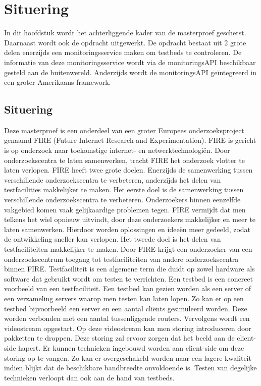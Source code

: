 \chapter{Situering}
{\samenvatting
In dit hoofdstuk wordt het achterliggende kader van de masterproef geschetst. Daarnaast wordt ook de opdracht uitgewerkt. De opdracht bestaat uit 2 grote delen enerzijds een monitoringsservice maken om testbeds te controleren. De informatie van deze monitoringsservice wordt via de monitoringsAPI beschikbaar gesteld aan de buitenwereld. Anderzijds wordt de monitoringsAPI geïntegreerd in een groter Amerikaans framework.}
\section{Situering}
\npar
Deze masterproef is een onderdeel van een groter Europees onderzoeksproject genaamd FIRE (Future Internet Research and Experimentation). FIRE is gericht is op onderzoek naar toekomstige internet- en netwerktechnologiën. Door onderzoekscentra te laten samenwerken\citep{Fire-what-is}, tracht FIRE het onderzoek vlotter te laten verlopen. FIRE heeft twee grote doelen. Enerzijds de samenwerking tussen verschillende onderzoekscentra te verbeteren, anderzijds het delen van testfacilities makkelijker te maken.
\npar
Het eerste doel is de samenwerking tussen verschillende onderzoekscentra te verbeteren. Onderzoekers binnen eenzelfde vakgebied komen vaak gelijkaardige problemen tegen. FIRE vermijdt dat men telkens het wiel opnieuw uitvindt, door deze onderzoekers makkelijker en meer te laten samenwerken. Hierdoor worden oplossingen en ideeën meer gedeeld, zodat de ontwikkeling sneller kan verlopen.
\clearpage
\npar
Het tweede doel is het delen van testfaciliteiten makkelijker te maken. Door FIRE krijgt een onderzoeker van een onderzoekscentrum toegang tot testfaciliteiten van andere onderzoekscentra binnen FIRE. Testfaciliteit is een algemene term die duidt op zowel hardware als software dat gebruikt wordt om testen te verrichten. Een testbed is een concreet voorbeeld van een testfaciliteit. Een testbed kan gezien worden als een server of een verzameling servers waarop men testen kan laten lopen. Zo kan er op een testbed bijvoorbeeld een server en een aantal cli\"ents gesimuleerd worden. Deze worden verbonden met een aantal tussenliggende routers. Vervolgens wordt een videostream opgestart. Op deze videostream kan men storing introduceren door pakketten te droppen. Deze storing zal ervoor zorgen dat het beeld aan de client-side hapert. Er kunnen technieken ingebouwd worden aan client-side om deze storing op te vangen. Zo kan er overgeschakeld worden naar een lagere kwaliteit indien blijkt dat de beschikbare bandbreedte onvoldoende is. Testen van degelijke technieken verloopt dan ook aan de hand van testbeds.
